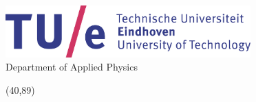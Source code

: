 \begin{titlepage}
\begin{center}
\includegraphics[height=2cm]{figures/tue-logo-high.png}\\
\large
Department of Applied Physics  \\

\vspace*{10cm}

\setlength{\TPHorizModule}{1mm}
\setlength{\TPVertModule}{\TPHorizModule}
\newlength{\backupparindent}
\setlength{\backupparindent}{\parindent}
\setlength{\parindent}{0mm}			
\begin{textblock}{95}(40,89)
    \vspace*{1mm}
    \huge
    \textbf{\doctitle \\}
    \Large
    \vspace*{5mm}
    \textit{\docsubtitle}\\
    \vspace*{10mm}
    \Large
    \me\\
\end{textblock}


 


\vfill

\setlength{\parindent}{\backupparindent}
\end{center}
\end{titlepage} 